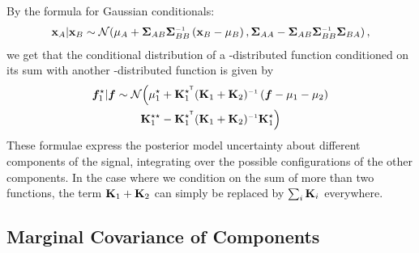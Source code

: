 By the formula for Gaussian conditionals:
%
\begin{align}
\vx_A | \vx_B \sim \Nt{\vmu_A + \vSigma_{AB} \vSigma_{BB}\inv \left( \vx_B - \vmu_B \right) }
{\vSigma_{AA} - \vSigma_{AB} \vSigma_{BB}\inv \vSigma_{BA} },
\end{align}
%
we get that the conditional distribution of a \gp{}-distributed function conditioned on its sum with another \gp{}-distributed function is given by
%
\begin{align}
\vf_1^\star | \vf \sim \Normal \Big( 
\vmu_1^\star + \vK_1^{\star\tra} & (\vK_1 + \vK_2)\inv \left( \vf - \vmu_1 - \vmu_2 \right) \nonumber \\
\vK_1^{\star\star} - \vK_1^{\star\tra} & (\vK_1 + \vK_2)\inv \vK_1^{\star} \Big)
\end{align}
%
These formulae express the posterior model uncertainty about different components of the signal, integrating over the possible configurations of the other components.
In the case where we condition on the sum of more than two functions, the term $\mathbf{K}_1 + \mathbf{K}_2$ can simply be replaced by $\sum_i \mathbf{K}_i$ everywhere.




\subsection{Marginal Covariance of Components}

